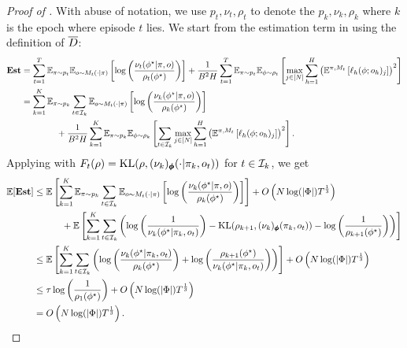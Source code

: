 \begin{proof}[Proof of ]
With abuse of notation, we use $p_t, \nu_t, \rho_t$ to denote the $p_k, \nu_k, \rho_k$ where $k$ is the epoch where episode $t$ lies. We start from the estimation term in  using the definition of $\overline{D}$:
\begin{align*}
    \textbf{\textup{Est}} 
    &= \sum_{t=1}^T \mathbb{E}_{\pi \sim p_t}\mathbb{E}_{o \sim M_t(\cdot|\pi)}\left[\log\left(\frac{\nu_t(\phi^\star|\pi, o)}{\rho_t(\phi^\star)}\right)\right] +  \frac{1}{B^2H}\sum_{t=1}^T\mathbb{E}_{\pi \sim p_t}\mathbb{E}_{\phi\sim \rho_t}\left[\max_{j\in[N]}\sum_{h=1}^H  \left(\mathbb{E}^{\pi, M_t}\left[\ell_h(\phi; o_h)_j\right]\right)^2\right] \\
    &= \sum_{k=1}^K \mathbb{E}_{\pi \sim p_k} \sum_{t\in\mathcal{I}_k} \mathbb{E}_{o \sim M_t(\cdot|\pi)}\left[\log\left(\frac{\nu_k(\phi^\star|\pi, o)}{\rho_k(\phi^\star)}\right)\right] \\
    &\qquad \qquad +  \frac{1}{B^2H}\sum_{k=1}^K\mathbb{E}_{\pi \sim p_k}\mathbb{E}_{\phi\sim \rho_k}\left[\sum_{t\in\mathcal{I}_k} \max_{j\in[N]}\sum_{h=1}^H  \left(\mathbb{E}^{\pi, M_t}\left[\ell_h(\phi; o_h)_j\right]\right)^2\right].  
\end{align*}
Applying  with $F_t(\rho) = \text{KL}(\rho, (\nu_k)_{\pmb{\phi}} (\cdot|\pi_k, o_t))$ for $t\in\mathcal{I}_k$, we get 
\begin{align*}
   \mathbb{E}[\textbf{\textup{Est}}] &\leq \mathbb{E}\left[\sum_{k=1}^K \mathbb{E}_{\pi \sim p_k} \sum_{t\in\mathcal{I}_k} \mathbb{E}_{o \sim M_t(\cdot|\pi)}\left[\log\left(\frac{\nu_k(\phi^\star|\pi, o)}{\rho_k(\phi^\star)}\right)\right] \right] + O\left( N \log(|\Phi|)T^{\frac{1}{3}} \right) \\
   &\qquad \quad + \mathbb{E}\left[\sum_{k=1}^K \sum_{t\in\mathcal{I}_k} \left(\log\left(\frac{1}{\nu_k(\phi^\star|\pi_k, o_t)}\right) - \text{KL}(\rho_{k+1}, (\nu_k)_{\pmb{\phi}} (\pi_k, o_t)) - \log\left(\frac{1}{\rho_{k+1}(\phi^\star)}\right)\right)\right] \\
   &\leq \mathbb{E}\left[\sum_{k=1}^K  \sum_{t\in\mathcal{I}_k} \left(\log\left(\frac{\nu_k(\phi^\star|\pi_k, o_t)}{\rho_k(\phi^\star)}\right) + \log\left(\frac{\rho_{k+1}(\phi^\star)}{\nu_k(\phi^\star|\pi_k, o_t)}\right)\right) \right]  + O\left( N\log(|\Phi|)T^{\frac{1}{3}} \right) \\
    &\leq \tau \log\left(\frac{1}{\rho_1(\phi^\star)}\right)  + O\left( N \log(|\Phi|)T^{\frac{1}{3}} \right) \\
    &= O\left( N\log(|\Phi|)T^{\frac{1}{3}} \right). 
\end{align*}
\end{proof}
